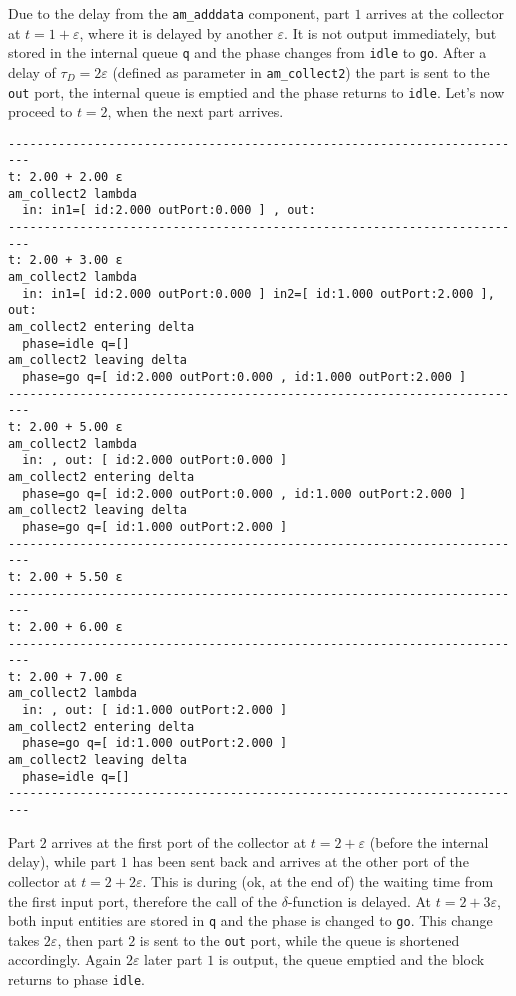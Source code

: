 \documentclass[12pt,oneside,a4paper,bibtotoc,BCOR=0pt,DIV=20]{scrreprt}
\newcommand{\cft}[1]{\mbox{\texttt{#1}}}   %
\newcommand{\epsi}{\varepsilon}
\begin{document}
Due to the delay from the \cft{am\_adddata} component, part $1$ arrives at the
collector at $t = 1 + \epsi$, where it is delayed by another $\epsi$. It is not
output immediately, but stored in the internal queue \cft{q} and the phase
changes from \cft{idle} to \cft{go}. After a delay of $\tau_D = 2\epsi$
(defined as parameter in \cft{am\_collect2}) the part is sent to the \cft{out}
port, the internal queue is emptied and the phase returns to \cft{idle}. Let's
now proceed to $t = 2$, when the next part arrives.


\begin{verbatim}
-------------------------------------------------------------------------
t: 2.00 + 2.00 ε
am_collect2 lambda
  in: in1=[ id:2.000 outPort:0.000 ] , out: 
-------------------------------------------------------------------------
t: 2.00 + 3.00 ε
am_collect2 lambda
  in: in1=[ id:2.000 outPort:0.000 ] in2=[ id:1.000 outPort:2.000 ], out:
am_collect2 entering delta
  phase=idle q=[] 
am_collect2 leaving delta
  phase=go q=[ id:2.000 outPort:0.000 , id:1.000 outPort:2.000 ]
-------------------------------------------------------------------------
t: 2.00 + 5.00 ε
am_collect2 lambda
  in: , out: [ id:2.000 outPort:0.000 ]
am_collect2 entering delta
  phase=go q=[ id:2.000 outPort:0.000 , id:1.000 outPort:2.000 ]
am_collect2 leaving delta
  phase=go q=[ id:1.000 outPort:2.000 ]
-------------------------------------------------------------------------
t: 2.00 + 5.50 ε
-------------------------------------------------------------------------
t: 2.00 + 6.00 ε
-------------------------------------------------------------------------
t: 2.00 + 7.00 ε
am_collect2 lambda
  in: , out: [ id:1.000 outPort:2.000 ]
am_collect2 entering delta
  phase=go q=[ id:1.000 outPort:2.000 ]
am_collect2 leaving delta
  phase=idle q=[] 
-------------------------------------------------------------------------
\end{verbatim}

Part $2$ arrives at the first port of the collector at $t = 2 + \epsi$
(before the internal delay), while part $1$ has been sent back and arrives
at the other port of the collector at $t = 2 + 2\epsi$. This is during (ok, at
the end of) the waiting time from the first input port, therefore the call of
the $\delta$-function is delayed. At $t = 2 + 3\epsi$, both input entities are
stored in \cft{q} and the phase is changed to \cft{go}. This change takes
$2\epsi$, then part $2$ is sent to the \cft{out} port, while the queue is
shortened accordingly. Again $2\epsi$ later part $1$ is output, the queue
emptied and the block returns to phase \cft{idle}.
\end{document}
